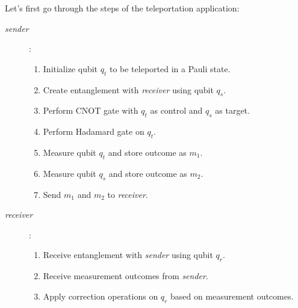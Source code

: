 Let's first go through the steps of the teleportation application:\newline
\begin{description}
  \item[\textit{sender}]:
        \begin{enumerate}
          \item Initialize qubit $q_t$ to be teleported in a Pauli state.
          \item Create entanglement with \textit{receiver} using qubit $q_s$.
          \item Perform CNOT gate with $q_t$ as control and $q_s$ as target.
          \item Perform Hadamard gate on $q_t$.
          \item Measure qubit $q_t$ and store outcome as $m_1$.
          \item Measure qubit $q_s$ and store outcome as $m_2$.
          \item Send $m_1$ and $m_2$ to \textit{receiver}.
        \end{enumerate}
  \item[\textit{receiver}]:
        \begin{enumerate}
          \item Receive entanglement with \textit{sender} using qubit $q_r$.
          \item Receive measurement outcomes from \textit{sender}.
          \item Apply correction operations on $q_r$ based on measurement outcomes.
        \end{enumerate}
\end{description}

